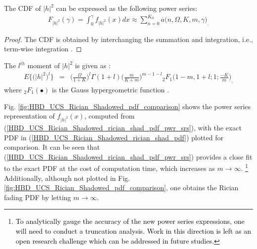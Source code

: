 \begin{theorem} \label{HBD_UCS_Rician_Shadowed_cdf_theorem}
The CDF of $|h|^2$ can be expressed as the following power series: 
\begin{eqnarray} \label{HBD_UCS_Rician_Shadowed_rician_shad_cdf_pwr_srs}
F_{|h|^2}(\gamma) = \int^{\gamma}_0 f_{|h|^2}(x) dx  \approx  \sum_{n=0}^{K_{tr}} \overline{a}\big(n,\Omega,K,m,\gamma\big)_.
\end{eqnarray}
\end{theorem}
\begin{proof}
The CDF is obtained by interchanging the summation and integration, i.e., term-wise integration \cite{gradshteyn2014table}.
\end{proof}

\begin{theorem} \label{HBD_UCS_Rician_Shadowed_l_moment_theorem}
The $l^{th}$ moment of $|h|^2$ is given as \cite[eq. (10)]{chun2017comprehensive}:
\begin{eqnarray} \label{HBD_UCS_Rician_Shadowed_rician_shad_frac_moment}
E\big\{\big(|h|^2\big)^l\big\} & = & \bigg(\frac{\Omega}{1+K}\bigg)^l \Gamma(1+l) \bigg(\frac{m}{K+m}\bigg)^{m-1-l} {}_2F_1\bigg(1-m,1+l;1;\frac{-K}{m}\bigg)_,
\end{eqnarray}
where $_2F_1(\bullet)$ is the Gauss hypergeometric function \cite{kumar2015approximate}. 
\end{theorem}

Fig. \ref{fig:HBD_UCS_Rician_Shadowed_pdf_comparison} shows the power series representation of $f_{|h|^2}(x)$, computed from (\ref{HBD_UCS_Rician_Shadowed_rician_shad_pdf_pwr_srs}), with the exact PDF in (\ref{HBD_UCS_Rician_Shadowed_rician_shad_pdf}) plotted for comparison. It can be seen that (\ref{HBD_UCS_Rician_Shadowed_rician_shad_pdf_pwr_srs}) provides a close fit to the exact PDF at the cost of computation time, which increases as $m\to\infty$. \textcolor{black}{\footnote{\textcolor{black}{To analytically gauge the accuracy of the new power series expressions, one will need to conduct a truncation analysis. Work in this direction is left as an open research challenge which can be addressed in future studies.}}} Additionally, although not plotted in Fig. \ref{fig:HBD_UCS_Rician_Shadowed_pdf_comparison}, one obtains the Rician fading PDF by letting $m \to \infty$.
 
